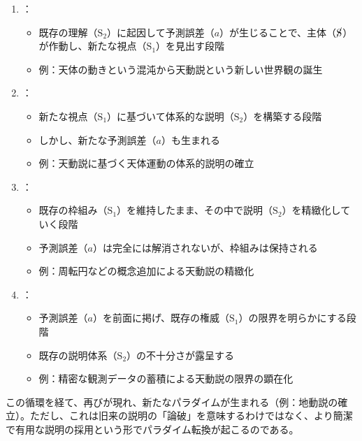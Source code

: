 \begin{enumerate}
\def\labelenumi{\arabic{enumi}.}
\tightlist
\item
  ：

  \begin{itemize}
  \tightlist
  \item
    既存の理解（\(\textrm{S}_2\)）に起因して予測誤差（\(a\)）が生じることで、主体（\(\cancel{\textrm{S}}\)）が作動し、新たな視点（\(\textrm{S}_1\)）を見出す段階
  \item
    例：天体の動きという混沌から天動説という新しい世界観の誕生
  \end{itemize}
\item
  ：

  \begin{itemize}
  \tightlist
  \item
    新たな視点（\(\textrm{S}_1\)）に基づいて体系的な説明（\(\textrm{S}_2\)）を構築する段階
  \item
    しかし、新たな予測誤差（\(a\)）も生まれる
  \item
    例：天動説に基づく天体運動の体系的説明の確立
  \end{itemize}
\item
  ：

  \begin{itemize}
  \tightlist
  \item
    既存の枠組み（\(\textrm{S}_1\)）を維持したまま、その中で説明（\(\textrm{S}_2\)）を精緻化していく段階
  \item
    予測誤差（\(a\)）は完全には解消されないが、枠組みは保持される
  \item
    例：周転円などの概念追加による天動説の精緻化
  \end{itemize}
\item
  ：

  \begin{itemize}
  \tightlist
  \item
    予測誤差（\(a\)）を前面に掲げ、既存の権威（\(\textrm{S}_1\)）の限界を明らかにする段階
  \item
    既存の説明体系（\(\textrm{S}_2\)）の不十分さが露呈する
  \item
    例：精密な観測データの蓄積による天動説の限界の顕在化
  \end{itemize}
\end{enumerate}

この循環を経て、再びが現れ、新たなパラダイムが生まれる（例：地動説の確立）。ただし、これは旧来の説明の「論破」を意味するわけではなく、より簡潔で有用な説明の採用という形でパラダイム転換が起こるのである。
